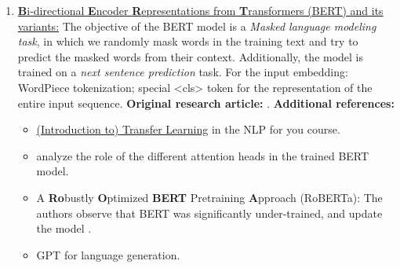 \documentclass[11pt, a4paper]{amsart}
\begin{document}

\begin{enumerate}[resume]
    \item \underline{\textbf{B}i-directional \textbf{E}ncoder \textbf{R}epresentations from \textbf{T}ransformers (BERT) and its variants:}
    \newline
    The objective of the BERT model is a \emph{Masked language modeling task}, in which we randomly mask words in the training text and try to predict the masked words from their context.
    Additionally, the model is trained on a \emph{next sentence prediction} task.
    For the input embedding: WordPiece tokenization;
    special <cls> token for the representation of the entire input sequence.
    \newline
    \textbf{Original research article:} \cite{DBLP:journals/corr/abs-1810-04805}.
    \newline
    \textbf{Additional references:}
    \begin{itemize}
        \item \href{https://lena-voita.github.io/nlp_course/transfer_learning.html}{(Introduction to) Transfer Learning} in the NLP for you course.
        \item \cite{clark-etal-2019-bert} analyze the role of the different attention heads in the trained BERT model.
        \item A \textbf{Ro}bustly \textbf{O}ptimized \textbf{BERT} Pretraining \textbf{A}pproach (RoBERTa):
        The authors observe that BERT was significantly under-trained, and update the model \cite{DBLP:journals/corr/abs-1907-11692}.
        \item GPT for language generation.
    \end{itemize}
    

\end{enumerate}
\end{document}
